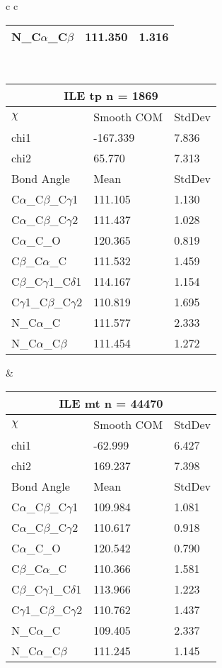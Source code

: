 \begin{longtable}{ c c }
\begin{tabular}{ l l l }
  N\_C$\alpha$\_C$\beta$ & 111.350 & 1.316\\
  \bottomrule
  \end{tabular}
  \\
  \begin{tabular}{ l l l }
  \toprule
  \multicolumn{3}{c}{ILE \textbf{tp} n = 1869} \\ \toprule
  $\chi$       & Smooth COM & StdDev \\ \midrule
  chi1 & -167.339 & 7.836 \\ 
  chi2 & 65.770 & 7.313 \\ \midrule
  Bond Angle   & Mean     & StdDev \\ \midrule
  C$\alpha$\_C$\beta$\_C$\gamma$1 & 111.105 & 1.130\\
  C$\alpha$\_C$\beta$\_C$\gamma$2 & 111.437 & 1.028\\
  C$\alpha$\_C\_O & 120.365 & 0.819\\
  C$\beta$\_C$\alpha$\_C & 111.532 & 1.459\\
  C$\beta$\_C$\gamma$1\_C$\delta$1 & 114.167 & 1.154\\
  C$\gamma$1\_C$\beta$\_C$\gamma$2 & 110.819 & 1.695\\
  N\_C$\alpha$\_C & 111.577 & 2.333\\
  N\_C$\alpha$\_C$\beta$ & 111.454 & 1.272\\
  \bottomrule
  \end{tabular}
  &
  \begin{tabular}{ l l l }
  \toprule
  \multicolumn{3}{c}{ILE \textbf{mt} n = 44470} \\ \toprule
  $\chi$       & Smooth COM & StdDev \\ \midrule
  chi1 & -62.999 & 6.427 \\ 
  chi2 & 169.237 & 7.398 \\ \midrule
  Bond Angle   & Mean     & StdDev \\ \midrule
  C$\alpha$\_C$\beta$\_C$\gamma$1 & 109.984 & 1.081\\
  C$\alpha$\_C$\beta$\_C$\gamma$2 & 110.617 & 0.918\\
  C$\alpha$\_C\_O & 120.542 & 0.790\\
  C$\beta$\_C$\alpha$\_C & 110.366 & 1.581\\
  C$\beta$\_C$\gamma$1\_C$\delta$1 & 113.966 & 1.223\\
  C$\gamma$1\_C$\beta$\_C$\gamma$2 & 110.762 & 1.437\\
  N\_C$\alpha$\_C & 109.405 & 2.337\\
  N\_C$\alpha$\_C$\beta$ & 111.245 & 1.145\\

\end{tabular}
\end{longtable}
